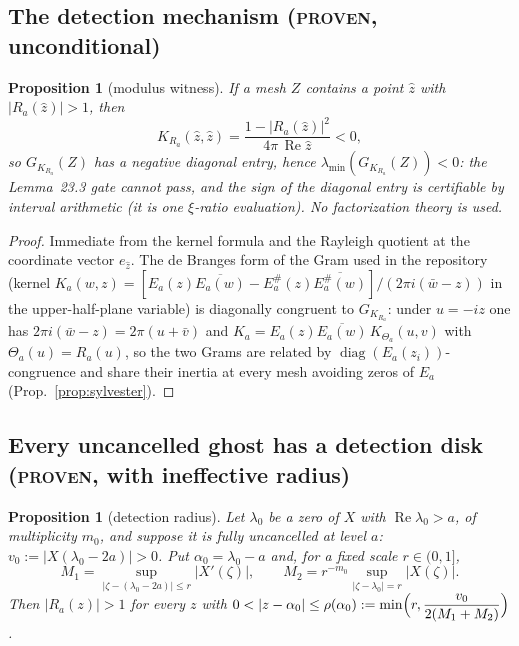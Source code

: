 \documentclass[11pt]{article}
\newtheorem{proposition}[theorem]{Proposition}
\theoremstyle{definition}
\theoremstyle{remark}
\newcommand{\re}{\operatorname{Re}}
\begin{document}
\subsection{The detection mechanism (\textsc{proven}, unconditional)}

\begin{proposition}[modulus witness]\label{prop:modulus-witness}
If a mesh $Z$ contains a point $\hat z$ with $|R_a(\hat z)|>1$, then
\[
K_{R_a}(\hat z,\hat z)=\frac{1-|R_a(\hat z)|^2}{4\pi\,\re\hat z}<0,
\]
so $G_{K_{R_a}}(Z)$ has a negative diagonal entry, hence
$\lambda_{\min}(G_{K_{R_a}}(Z))<0$: the Lemma~23.3 gate cannot pass, and the
sign of the diagonal entry is certifiable by interval arithmetic (it is one
$\xi$-ratio evaluation). No factorization theory is used.
\end{proposition}

\begin{proof}
Immediate from the kernel formula and the Rayleigh quotient at the
coordinate vector $e_{\hat z}$. The de Branges form of the Gram used in the
repository (kernel
$K_a(w,z)=[E_a(z)\overline{E_a(w)}-E_a^{\#}(z)\overline{E_a^{\#}(w)}]/(2\pi i(\bar w-z))$
in the upper-half-plane variable) is diagonally congruent to
$G_{K_{R_a}}$: under $u=-iz$ one has $2\pi i(\bar w-z)=2\pi(u+\bar v)$ and
$K_a=E_a(z)\overline{E_a(w)}\,K_{\Theta_a}(u,v)$ with
$\Theta_a(u)=R_a(u)$, so the two Grams are related by
$\operatorname{diag}(E_a(z_i))$-congruence and share their inertia at every
mesh avoiding zeros of $E_a$ (Prop.~\ref{prop:sylvester}).
\end{proof}

\subsection{Every uncancelled ghost has a detection disk
(\textsc{proven}, with ineffective radius)}

\begin{proposition}[detection radius]\label{prop:detection-radius}
Let $\lambda_0$ be a zero of $X$ with $\re\lambda_0>a$, of multiplicity
$m_0$, and suppose it is fully uncancelled at level $a$:
$v_0:=|X(\lambda_0-2a)|>0$. Put $\alpha_0=\lambda_0-a$ and, for a fixed
scale $r\in(0,1]$,
\[
M_1=\sup_{|\zeta-(\lambda_0-2a)|\le r}|X'(\zeta)|,\qquad
M_2=r^{-m_0}\sup_{|\zeta-\lambda_0|=r}|X(\zeta)| .
\]
Then $|R_a(z)|>1$ for every $z$ with
$0<|z-\alpha_0|\le\rho(\alpha_0):=\min\Bigl(r,\dfrac{v_0}{2(M_1+M_2)}\Bigr)$.
\end{proposition}
\end{document}
